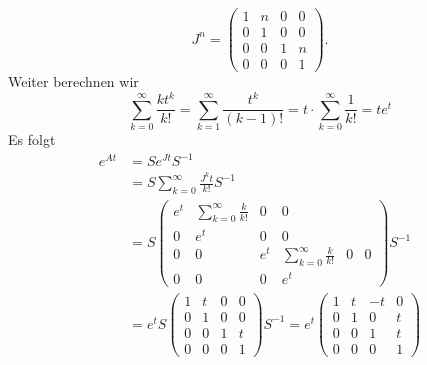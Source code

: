 \documentclass{article}
\begin{document}
\begin{enumerate}[(a)]
    \[
        J^n = \begin{pmatrix}
            1 & n & 0 & 0\\
            0 & 1 & 0 & 0\\
            0 & 0 & 1 & n\\
            0 & 0 & 0 & 1
        \end{pmatrix}.
    \]
    Weiter berechnen wir
    \[
        \sum_{k = 0}^{\infty} \frac{kt^k}{k!} = \sum_{k = 1}^{\infty} \frac{t^k}{(k-1)!} = t \cdot \sum_{k = 0}^{\infty} \frac{1}{k!} = t e^t
    \]
    Es folgt 
    \begin{align*}
        e^{At} &= S e^{Jt} S^{-1}\\
        &= S \sum_{k = 0}^{\infty} \frac{J^kt}{k!} S^{-1}\\
        &= S \begin{pmatrix}
            e^t & \sum_{k = 0}^{\infty} \frac{k}{k!} & 0 & 0\\
            0 & e^t & 0 & 0\\
            0 & 0 & e^t & \sum_{k = 0}^{\infty} \frac{k}{k!} & 0 & 0\\
            0 & 0 & 0 & e^t
        \end{pmatrix} S^{-1}\\
        &= e^t S \begin{pmatrix}
            1 & t & 0 & 0\\
            0 & 1 & 0 & 0\\
            0 & 0 & 1 & t\\
            0 & 0 & 0 & 1
        \end{pmatrix} S^{-1} = e^t \begin{pmatrix}
            1 & t & -t & 0\\
            0 & 1 & 0 & t\\
            0 & 0 & 1 & t\\
            0 & 0 & 0 & 1
        \end{pmatrix}
    \end{align*}
\end{enumerate}
\end{document}
